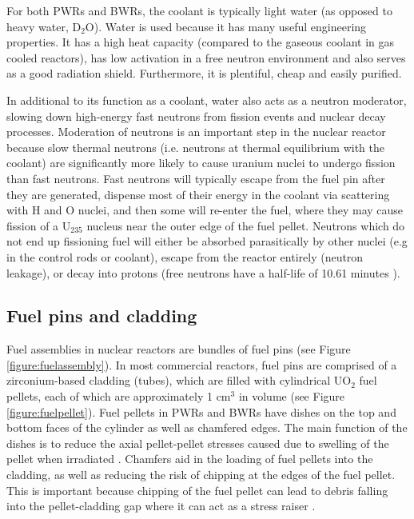 For both PWRs and BWRs, the coolant is typically light water (as opposed to heavy water, D$_{2}$O). Water is used because it has many useful engineering properties. It has a high heat capacity (compared to the gaseous coolant in gas cooled reactors), has low activation in a free neutron environment and also serves as a good radiation shield. Furthermore, it is plentiful, cheap and easily purified.

In additional to its function as a coolant, water also acts as a neutron moderator, slowing down high-energy fast neutrons from fission events and nuclear decay processes. Moderation of neutrons is an important step in the nuclear reactor because slow thermal neutrons (i.e. neutrons at thermal equilibrium with the coolant) are significantly more likely to cause uranium nuclei to undergo fission than fast neutrons. Fast neutrons will typically escape from the fuel pin after they are generated, dispense most of their energy in the coolant via scattering with H and O nuclei, and then some will re-enter the fuel, where they may cause fission of a U$_{235}$ nucleus near the outer edge of the fuel pellet. Neutrons which do not end up fissioning fuel will either be absorbed parasitically by other nuclei (e.g in the control rods or coolant), escape from the reactor entirely (neutron leakage), or decay into protons (free neutrons have a half-life of 10.61 minutes \cite{Christensen1972}).

\subsection{Fuel pins and cladding} \label{ss_fuelpin}

Fuel assemblies in nuclear reactors are bundles of fuel pins (see Figure \ref{figure:fuelassembly}). In most commercial reactors, fuel pins are comprised of a zirconium-based cladding (tubes), which are filled with cylindrical UO$_{2}$ fuel pellets, each of which are approximately 1 cm$^{3}$ in volume (see Figure \ref{figure:fuelpellet}). Fuel pellets in PWRs and BWRs have dishes on the top and bottom faces of the cylinder as well as chamfered edges. The main function of the dishes is  to reduce the axial pellet-pellet stresses caused due to swelling of the pellet when irradiated \cite{marino2005crack}. Chamfers aid in the loading of fuel pellets into the cladding, as well as reducing the risk of chipping at the edges of the fuel pellet. This is important because chipping of the fuel pellet can lead to debris falling into the pellet-cladding gap where it can act as a stress raiser \cite{doerr2015nuclear}.

